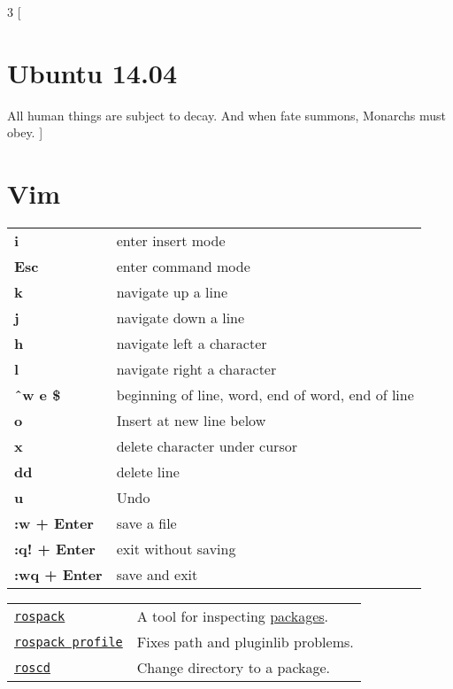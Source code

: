 \documentclass[10pt,landscape]{article}
\begin{document}
\begin{multicols}{3}
[
\section*{Ubuntu 14.04}
All human things are subject to decay. And when fate summons, Monarchs must obey.
]

\section*{Vim}
\vspace{-0.7em}
\begin{tabular}{l l}
\textbf{i} & enter insert mode\\
\textbf{Esc} & enter command mode \\
\textbf{k} & navigate up a line\\
\textbf{j} & navigate down a line\\
\textbf{h} & navigate left a character\\
\textbf{l} & navigate right a character\\
\textbf{\^\ w e \$} & beginning of line, word, end of word, end of line\\
\textbf{o} & Insert at new line below\\
\textbf{x} & delete character under cursor\\
\textbf{dd} & delete line\\
\textbf{u} & Undo\\
\textbf{:w + Enter} & save a file\\
\textbf{:q! + Enter} & exit without saving\\
\textbf{:wq + Enter} & save and exit\\
\end{tabular}

\vfill
\columnbreak

\begin{tabular}{l l}
\texttt{\href{http://wiki.ros.org/rospack}{rospack}} & A tool for inspecting \href{http://wiki.ros.org/Packages}{packages}. \\
\texttt{\href{http://docs.ros.org/independent/api/rospkg/html/rospack.html\#rospack-profile}{rospack profile}} & Fixes path and pluginlib problems. \\
\texttt{\href{http://wiki.ros.org/rosbash\#roscd}{roscd}} & Change directory to a package. \\
\end{tabular}

\vfill
\columnbreak


\end{multicols}
\end{document}
